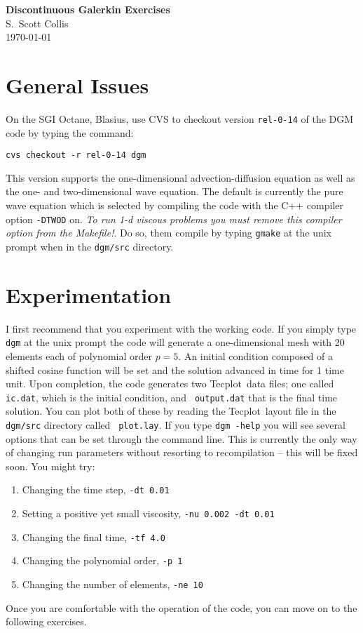 \documentclass[11pt]{article}
\newcommand{\tecplot}{{\sf Tecplot}}
\begin{document}
\begin{center}
{\normalsize\bf Discontinuous Galerkin Exercises}\\
{\normalsize S.\ Scott Collis}\\
{\normalsize \today}
\end{center}

\section*{\normalsize\bf General Issues}

On the SGI Octane, Blasius, use CVS to checkout version {\tt rel-0-14} of the
DGM code by typing the command:
\begin{center}
\tt cvs checkout -r rel-0-14 dgm
\end{center}
This version supports the one-dimensional advection-diffusion equation as well
as the one- and two-dimensional wave equation.  The default is currently the
pure wave equation which is selected by compiling the code with the C++
compiler option {\tt -DTWOD} on.  {\em To run 1-d viscous problems you must
remove this compiler option from the Makefile!}.  Do so, them compile by
typing {\tt gmake} at the unix prompt when in the {\tt dgm/src} directory.

\medskip
{}

\section*{\normalsize\bf Experimentation}

I first recommend that you experiment with the working code.  If you simply
type {\tt dgm} at the unix prompt the code will generate a one-dimensional
mesh with 20 elements each of polynomial order $p=5$.  An initial condition
composed of a shifted cosine function will be set and the solution advanced in
time for 1 time unit.  Upon completion, the code generates two \tecplot\ data
files; one called {\tt ic.dat}, which is the initial condition, and {\tt
output.dat} that is the final time solution.  You can plot both of these by
reading the \tecplot\ layout file in the {\tt dgm/src} directory called {\tt
plot.lay}.  If you type {\tt dgm -help} you will see several options that can
be set through the command line.  This is currently the only way of changing
run parameters without resorting to recompilation -- this will be fixed soon.
You might try:
\begin{enumerate}
\item Changing the time step, {\tt -dt 0.01}
\item Setting a positive yet small viscosity, {\tt -nu 0.002 -dt 0.01}
\item Changing the final time, {\tt -tf 4.0}
\item Changing the polynomial order, {\tt -p 1}
\item Changing the number of elements, {\tt -ne 10}
\end{enumerate}
Once you are comfortable with the operation of the code, you can move on to
the following exercises.
\end{document}
